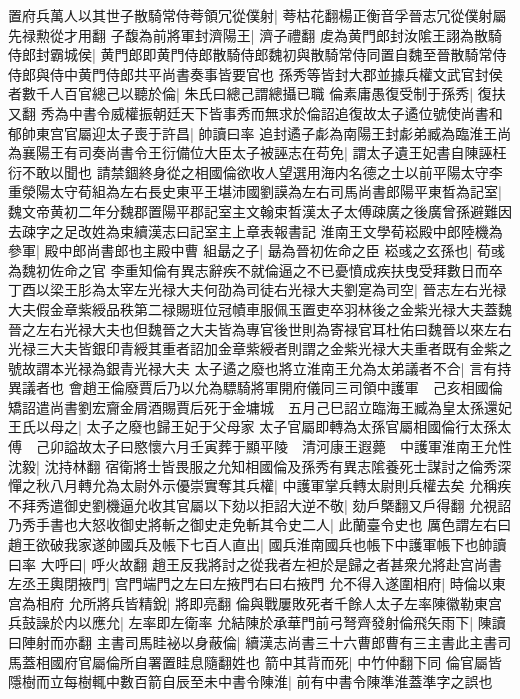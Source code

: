 置府兵萬人以其世子散騎常侍荂領冗從僕射|{
	荂枯花翻楊正衡音孚晉志冗從僕射屬先禄勲從才用翻}
子馥為前將軍封濟陽王|{
	濟子禮翻}
䖍為黄門郎封汝隂王詡為散騎侍郎封霸城侯|{
	黄門郎即黄門侍郎散騎侍郎魏初與散騎常侍同置自魏至晉散騎常侍侍郎與侍中黄門侍郎共平尚書奏事皆要官也}
孫秀等皆封大郡並據兵權文武官封侯者數千人百官總己以聽於倫|{
	朱氏曰總己謂總攝已職}
倫素庸愚復受制于孫秀|{
	復扶又翻}
秀為中書令威權振朝廷天下皆事秀而無求於倫詔追復故太子遹位號使尚書和郁帥東宫官屬迎太子喪于許昌|{
	帥讀曰率}
追封遹子虨為南陽王封虨弟臧為臨淮王尚為襄陽王有司奏尚書令王衍備位大臣太子被誣志在苟免|{
	謂太子遺王妃書自陳誣枉衍不敢以聞也}
請禁錮終身從之相國倫欲收人望選用海内名德之士以前平陽太守李重滎陽太守荀組為左右長史東平王堪沛國劉謨為左右司馬尚書郎陽平東晳為記室|{
	魏文帝黄初二年分魏郡置陽平郡記室主文翰束晳漢太子太傅疎廣之後廣曾孫避難因去疎字之足改姓為束續漢志曰記室主上章表報書記}
淮南王文學荀崧殿中郎陸機為參軍|{
	殿中郎尚書郎也主殿中曹}
組朂之子|{
	朂為晉初佐命之臣}
崧彧之玄孫也|{
	荀彧為魏初佐命之官}
李重知倫有異志辭疾不就倫逼之不已憂憤成疾扶曳受拜數日而卒　丁酉以梁王肜為太宰左光禄大夫何劭為司徒右光禄大夫劉寔為司空|{
	晉志左右光禄大夫假金章紫綬品秩第二禄賜班位冠幘車服佩玉置吏卒羽林後之金紫光禄大夫蓋魏晉之左右光禄大夫也但魏晉之大夫皆為專官後世則為寄禄官耳杜佑曰魏晉以來左右光禄三大夫皆銀印青綬其重者詔加金章紫綬者則謂之金紫光禄大夫重者既有金紫之號故謂本光禄為銀青光禄大夫}
太子遹之廢也將立淮南王允為太弟議者不合|{
	言有持異議者也}
會趙王倫廢賈后乃以允為驃騎將軍開府儀同三司領中護軍　己亥相國倫矯詔遣尚書劉宏齎金屑酒賜賈后死于金墉城　五月己巳詔立臨海王臧為皇太孫還妃王氏以母之|{
	太子之廢也歸王妃于父母家}
太子官屬即轉為太孫官屬相國倫行太孫太傅　己卯謚故太子曰愍懷六月壬寅葬于顯平陵　清河康王遐薨　中護軍淮南王允性沈毅|{
	沈持林翻}
宿衛將士皆畏服之允知相國倫及孫秀有異志隂養死士謀討之倫秀深憚之秋八月轉允為太尉外示優崇實奪其兵權|{
	中護軍掌兵轉太尉則兵權去矣}
允稱疾不拜秀遣御史劉機逼允收其官屬以下劾以拒詔大逆不敬|{
	劾戶槩翻又戶得翻}
允視詔乃秀手書也大怒收御史將斬之御史走免斬其令史二人|{
	此蘭臺令史也}
厲色謂左右曰趙王欲破我家遂帥國兵及帳下七百人直出|{
	國兵淮南國兵也帳下中護軍帳下也帥讀曰率}
大呼曰|{
	呼火故翻}
趙王反我將討之從我者左袒於是歸之者甚衆允將赴宫尚書左丞王輿閉掖門|{
	宫門端門之左曰左掖門右曰右掖門}
允不得入遂圍相府|{
	時倫以東宫為相府}
允所將兵皆精銳|{
	將即亮翻}
倫與戰屢敗死者千餘人太子左率陳徽勒東宫兵鼓譟於内以應允|{
	左率即左衛率}
允結陳於承華門前弓弩齊發射倫飛矢雨下|{
	陳讀曰陣射而亦翻}
主書司馬眭袐以身蔽倫|{
	續漢志尚書三十六曹郎曹有三主書此主書司馬蓋相國府官屬倫所自署置眭息隨翻姓也}
箭中其背而死|{
	中竹仲翻下同}
倫官屬皆隱樹而立每樹輒中數百箭自辰至未中書令陳淮|{
	前有中書令陳準淮蓋準字之誤也}
